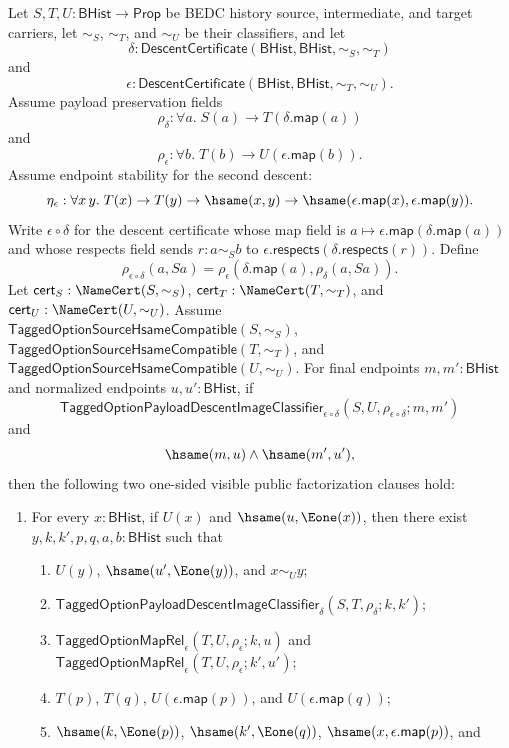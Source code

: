 \begin{theorem}
Let $S,T,U:\mathsf{BHist}\to\mathsf{Prop}$ be BEDC history source,
intermediate, and target carriers, let $\sim_S$, $\sim_T$, and $\sim_U$ be their
classifiers, and let
$$
\delta:\mathsf{DescentCertificate}(\mathsf{BHist},\mathsf{BHist},\sim_S,\sim_T)
$$
and
$$
\epsilon:\mathsf{DescentCertificate}(\mathsf{BHist},\mathsf{BHist},\sim_T,\sim_U).
$$
Assume payload preservation fields
$$
\rho_{\delta}:\forall a.\;S(a)\to T(\delta.\mathsf{map}(a))
$$
and
$$
\rho_{\epsilon}:\forall b.\;T(b)\to U(\epsilon.\mathsf{map}(b)).
$$
Assume endpoint stability for the second descent:
$$
\eta_{\epsilon}:\forall x\,y.\;
T(x)\to T(y)\to \hsame(x,y)\to
\hsame(\epsilon.\mathsf{map}(x),\epsilon.\mathsf{map}(y)).
$$
Write $\epsilon\circ\delta$ for the descent certificate whose map field is
$a\mapsto\epsilon.\mathsf{map}(\delta.\mathsf{map}(a))$ and whose respects field
sends $r:a\sim_S b$ to
$\epsilon.\mathsf{respects}(\delta.\mathsf{respects}(r))$. Define
$$
\rho_{\epsilon\circ\delta}(a,Sa)=
\rho_{\epsilon}(\delta.\mathsf{map}(a),\rho_{\delta}(a,Sa)).
$$
Let $\mathsf{cert}_S:\NameCert(S,\sim_S)$,
$\mathsf{cert}_T:\NameCert(T,\sim_T)$, and
$\mathsf{cert}_U:\NameCert(U,\sim_U)$. Assume
$\mathsf{TaggedOptionSourceHsameCompatible}(S,\sim_S)$,
$\mathsf{TaggedOptionSourceHsameCompatible}(T,\sim_T)$, and
$\mathsf{TaggedOptionSourceHsameCompatible}(U,\sim_U)$. For final endpoints
$m,m':\mathsf{BHist}$ and normalized endpoints $u,u':\mathsf{BHist}$, if
$$
\mathsf{TaggedOptionPayloadDescentImageClassifier}_{\epsilon\circ\delta}
(S,U,\rho_{\epsilon\circ\delta};m,m')
$$
and
$$
\hsame(m,u)\land \hsame(m',u'),
$$
then the following two one-sided visible public factorization clauses hold:
\begin{enumerate}
\item For every $x:\mathsf{BHist}$, if $U(x)$ and $\hsame(u,\Eone(x))$, then
there exist $y,k,k',p,q,a,b:\mathsf{BHist}$ such that
\begin{enumerate}
\item $U(y)$, $\hsame(u',\Eone(y))$, and $x\sim_U y$;
\item $\mathsf{TaggedOptionPayloadDescentImageClassifier}_{\delta}
(S,T,\rho_{\delta};k,k')$;
\item $\mathsf{TaggedOptionMapRel}_{\epsilon}(T,U,\rho_{\epsilon};k,u)$ and
$\mathsf{TaggedOptionMapRel}_{\epsilon}(T,U,\rho_{\epsilon};k',u')$;
\item $T(p)$, $T(q)$, $U(\epsilon.\mathsf{map}(p))$, and
$U(\epsilon.\mathsf{map}(q))$;
\item $\hsame(k,\Eone(p))$, $\hsame(k',\Eone(q))$,
$\hsame(x,\epsilon.\mathsf{map}(p))$, and

\end{enumerate}
\end{enumerate}
\end{theorem}
